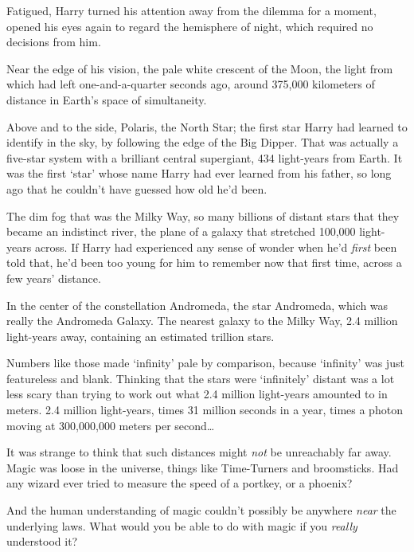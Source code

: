 Fatigued, Harry turned his attention away from the dilemma for a moment, opened
his eyes again to regard the hemisphere of night, which required no decisions
from him.

Near the edge of his vision, the pale white crescent of the Moon, the light
from which had left one-and-a-quarter seconds ago, around 375,000 kilometers of
distance in Earth's space of simultaneity.

Above and to the side, Polaris, the North Star; the first star Harry had
learned to identify in the sky, by following the edge of the Big Dipper. That
was actually a five-star system with a brilliant central supergiant, 434
light-years from Earth. It was the first `star' whose name Harry had ever
learned from his father, so long ago that he couldn't have guessed how old he'd
been.

The dim fog that was the Milky Way, so many billions of distant stars that they
became an indistinct river, the plane of a galaxy that stretched 100,000
light-years across. If Harry had experienced any sense of wonder when he'd
\emph{first} been told that, he'd been too young for him to remember now that
first time, across a few years' distance.

In the center of the constellation Andromeda, the star Andromeda, which was
really the Andromeda Galaxy. The nearest galaxy to the Milky Way, 2.4 million
light-years away, containing an estimated trillion stars.

Numbers like those made `infinity' pale by comparison, because `infinity' was
just featureless and blank. Thinking that the stars were `infinitely' distant
was a lot less scary than trying to work out what 2.4 million light-years
amounted to in meters. 2.4 million light-years, times 31 million seconds in a
year, times a photon moving at 300,000,000 meters per second{\ldots}

It was strange to think that such distances might \emph{not} be unreachably far
away. Magic was loose in the universe, things like Time-Turners and
broomsticks. Had any wizard ever tried to measure the speed of a portkey, or a
phoenix?

And the human understanding of magic couldn't possibly be anywhere \emph{near}
the underlying laws. What would you be able to do with magic if you
\emph{really} understood it?

